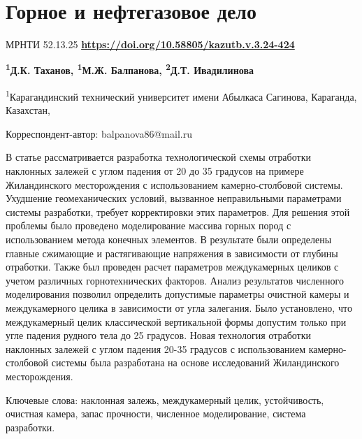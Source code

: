 \newpage
\let\cleardoublepage\clearpage
\chapter{Горное и нефтегазовое дело}
МРНТИ 52.13.25
\hfill {\bfseries \href{https://doi.org/10.58805/kazutb.v.3.24-424}{https://doi.org/10.58805/kazutb.v.3.24-424}}


\begin{center}
{\bfseries \textsuperscript{1}Д.К. Таханов, \textsuperscript{1}М.Ж.
Балпанова\envelope, \textsuperscript{2}Д.Т. Ивадилинова}

\textsuperscript{1}Карагандинский технический университет имени Абылкаса
Сагинова, Караганда, Казахстан,
\end{center}
\envelope Корреспондент-автор: balpanova86@mail.ru


В статье рассматривается разработка технологической схемы отработки
наклонных залежей с углом падения от 20 до 35 градусов на примере
Жиландинского месторождения с использованием камерно-столбовой системы.
Ухудшение геомеханических условий, вызванное неправильными параметрами
системы разработки, требует корректировки этих параметров. Для решения
этой проблемы было проведено моделирование массива горных пород с
использованием метода конечных элементов. В результате были определены
главные сжимающие и растягивающие напряжения в зависимости от глубины
отработки. Также был проведен расчет параметров междукамерных целиков с
учетом различных горнотехнических факторов. Анализ результатов
численного моделирования позволил определить допустимые параметры
очистной камеры и междукамерного целика в зависимости от угла залегания.
Было установлено, что междукамерный целик классической вертикальной
формы допустим только при угле падения рудного тела до 25 градусов.
Новая технология отработки наклонных залежей с углом падения 20-35
градусов с использованием камерно-столбовой системы была разработана на
основе исследований Жиландинского месторождения.

Ключевые слова: наклонная залежь, междукамерный целик, устойчивость,
очистная камера, запас прочности, численное моделирование, система
разработки.


